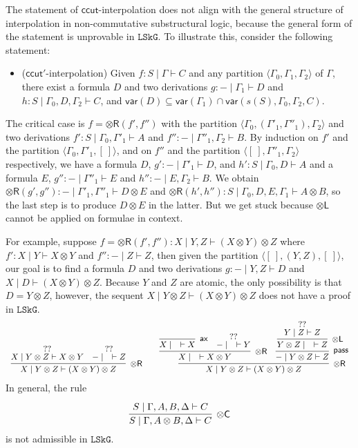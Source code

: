 \documentclass[submission,copyright,creativecommons]{eptcs}
\theoremstyle{definition}
\newcommand{\GG}{\Gamma}
\newcommand{\GD}{\Delta}
\newcommand{\tl}{\otimes \mathsf{L}}
\newcommand{\tr}{\otimes\mathsf{R}}
\newcommand{\pass}{\mathsf{pass}}
\newcommand{\ax}{\mathsf{ax}}
\newcommand{\ot}{\otimes}
\newcommand{\vdG}{\vdash}
\newcommand{\LSkG}{$\mathtt{LSkG}$}
\newcommand{\mf}[1]{\mathsf{#1}}
\newcommand{\vars}[1]{\mathsf{var}(#1)}
\begin{document}
The statement of $\mf{ccut}$-interpolation does not align with the general structure of interpolation in non-commutative substructural logic, because the general form of the statement is unprovable in \LSkG.
To illustrate this, consider the following statement:
\begin{itemize}
  \item[\ ] ($\mf{ccut'}$-interpolation) Given $f: S \mid \Gamma \vdG C$ and any partition $\langle \GG_0,\GG_1, \GG_2 \rangle$ of $\GG$, there exist a formula $D$ and two derivations  $g : {-} \mid \GG_1 \vdG D$ and $h : S \mid \GG_0, D, \GG_2 \vdG C$, and $\vars{D} \subseteq \vars{\GG_1} \cap \vars{s(S), \GG_0, \GG_2, C}$.
\end{itemize}
The critical case is $f = \tr (f',f'')$ with the partition $\langle \GG_0, (\GG'_1, \GG''_1), \GG_2\rangle$ and two derivations $f' : S \mid \GG_0 , \GG'_1 \vdG A$ and $f'' : {-} \mid \GG''_1 , \GG_2 \vdG B$.
By induction on $f'$ and the partition $\langle \GG_0 , \GG'_1, [\ ] \rangle$, and on $f''$ and the partition $\langle [\ ], \GG''_1, \GG_2\rangle$ respectively, we have a formula $D$, $g' : {-} \mid \GG'_1 \vdG D$, and $h': S \mid \GG_0 , D \vdG A$ and a formula $E$, $g'' : {-} \mid \GG''_1 \vdG E$ and $h'': {-} \mid E, \GG_2 \vdG B$.
We obtain $\tr (g',g'') : {-} \mid \GG'_1, \GG''_1 \vdG D \ot E$ and $\tr (h', h'') : S \mid \GG_0, D, E, \GG_1 \vdG A \ot B$, so the last step is to produce $D \ot E$ in the latter.
But we get stuck because $\tl$ cannot be applied on formulae in context.

For example, suppose $f = \tr (f',f''): X \mid Y, Z \vdG (X\ot Y)\ot Z$ where $f':X \mid Y \vdG X\ot Y$ and $f'': {-} \mid Z \vdG Z$, then given the partition $\langle [\ ], (Y,Z), [\ ]\rangle$, our goal is to find a formula $D$ and two derivations $g: {-} \mid Y, Z \vdG D$ and $X \mid D \vdG (X\ot Y)\ot Z$.
Because $Y$ and $Z$ are atomic, the only possibility is that $D = Y \ot Z$, however, the sequent $X \mid Y \ot Z \vdG (X \ot Y) \ot Z$ does not have a proof in \LSkG.
\begin{equation*}\label{example:ccut:failure}
  \small\begin{array}{c}
    \infer[\tr]{X \mid Y \ot Z \vdG (X \ot Y) \ot Z}{
    \deduce{X \mid Y\ot Z \vdG X \ot Y}{??}
    &
    \deduce{{-} \mid \quad \vdG Z}{??}
  }
  \qquad
  \infer[\tr]{X \mid Y \ot Z \vdG (X \ot Y) \ot Z}{
    \infer[\tr]{X \mid \quad \vdG X \ot Y}{
      \infer[\ax]{X \mid \quad \vdG X}{}
      &
      \deduce{{-} \mid \quad \vdG Y}{??}
    }
    &
    \infer[\pass]{{-} \mid Y \ot Z \vdG Z}{
      \infer[\tl]{Y \ot Z \mid \quad \vdG Z}{
        \deduce{Y \mid Z \vdG Z}{??}
      }
    }
  }
  \end{array}
\end{equation*}
In general, the rule
\begin{displaymath}
  \infer[\ot\mf{C}]{S \mid \GG , A \ot B , \GD \vdG C}{
    \deduce{S \mid \GG, A , B , \GD \vdG C}{}
  }
\end{displaymath}
is not admissible in \LSkG.
\end{document}
